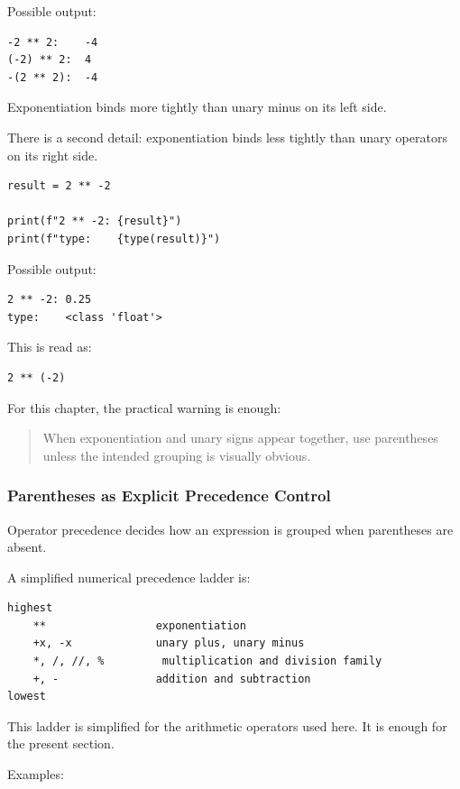 Possible output:

\begin{verbatim}
-2 ** 2:    -4
(-2) ** 2:  4
-(2 ** 2):  -4
\end{verbatim}

Exponentiation binds more tightly than unary minus on its left side.

There is a second detail: exponentiation binds less tightly than unary operators on its right side.

\begin{verbatim}
result = 2 ** -2

print(f"2 ** -2: {result}")
print(f"type:    {type(result)}")
\end{verbatim}

Possible output:

\begin{verbatim}
2 ** -2: 0.25
type:    <class 'float'>
\end{verbatim}

This is read as:

\begin{verbatim}
2 ** (-2)
\end{verbatim}

For this chapter, the practical warning is enough:

\begin{quote}
When exponentiation and unary signs appear together, use parentheses unless the intended grouping is visually obvious.
\end{quote}

\subsubsection{Parentheses as Explicit Precedence Control}

Operator precedence decides how an expression is grouped when parentheses are absent.

A simplified numerical precedence ladder is:

\begin{verbatim}
highest
    **                 exponentiation
    +x, -x             unary plus, unary minus
    *, /, //, %         multiplication and division family
    +, -               addition and subtraction
lowest
\end{verbatim}

This ladder is simplified for the arithmetic operators used here. It is enough for the present section.

Examples:

